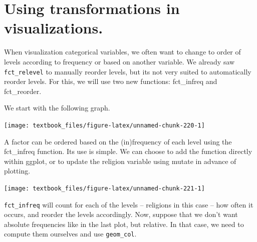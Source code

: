 \documentclass[]{tufte-book}
\newenvironment{Shaded}{}{}
\newcommand{\KeywordTok}[1]{\textcolor[rgb]{0.00,0.44,0.13}{\textbf{#1}}}
\newcommand{\NormalTok}[1]{#1}
\newcommand{\OperatorTok}[1]{\textcolor[rgb]{0.40,0.40,0.40}{#1}}
\newcommand{\StringTok}[1]{\textcolor[rgb]{0.25,0.44,0.63}{#1}}
\begin{document}
\hypertarget{using-transformations-in-visualizations.}{%
\section{Using transformations in visualizations.}\label{using-transformations-in-visualizations.}}

When visualization categorical variables, we often want to change to order of levels according to frequency or based on another variable. We already saw \texttt{fct\_relevel} to manually reorder levels, but its not very suited to automatically reorder levels. For this, we will use two new functions: fct\_infreq and fct\_reorder.

We start with the following graph.

\begin{Shaded}
\end{Shaded}

\texttt{[image: textbook\_files/figure-latex/unnamed-chunk-220-1]}

A factor can be ordered based on the (in)frequency of each level using the fct\_infreq function. Its use is simple. We can choose to add the function directly within ggplot, or to update the religion variable using mutate in advance of plotting.

\begin{Shaded}
\end{Shaded}

\texttt{[image: textbook\_files/figure-latex/unnamed-chunk-221-1]}

\texttt{fct\_infreq} will count for each of the levels -- religions in this case -- how often it occurs, and reorder the levels accordingly. Now, suppose that we don't want absolute frequencies like in the last plot, but relative. In that case, we need to compute them ourselves and use \texttt{geom\_col}.
\end{document}
